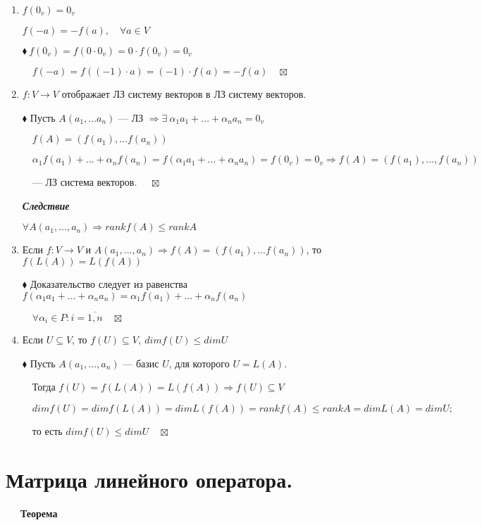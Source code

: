\documentclass[a4paper, 12pt]{report}
\begin{document}
	\begin{enumerate}
		\item $f(0_v) = 0_v$
		
		$f(-a) = -f(a), \quad \forall a\in V$
		
		$\blacklozenge \ f(0_v) = f(0\cdot 0_v) = 0\cdot f(0_v) = 0_v$
		
		$\quad f(-a) = f((-1)\cdot a) = (-1)\cdot f(a) = -f(a) \quad \boxtimes$
		
		\item $f: V\rightarrow V$ отображает ЛЗ систему векторов в ЛЗ систему векторов.
		
		$\blacklozenge$ Пусть $A(a_1,...a_n)$ --- ЛЗ $\Rightarrow \exists\  \alpha_1 a_1 + ... + \alpha_n a_n = 0_v$
		
		$\quad f(A) = (f(a_1),...f(a_n))$
		
		$\quad \alpha_1 f(a_1) + ... + \alpha_n f(a_n) = f(\alpha_1 a_1 + ... + \alpha_n a_n) = f(0_v) = 0_v \Rightarrow f(A) = (f(a_1),...,f(a_n))$ 
		
		$\quad$--- ЛЗ система векторов. $\quad \boxtimes$
		
		\textit{\textbf{Следствие}}
		
		$\forall A(a_1,...,a_n)\Rightarrow rank f(A) \leqslant rank A$
		\item Если $f:V\rightarrow V$ и $A(a_1,...,a_n)\Rightarrow f(A) = (f(a_1),...f(a_n))$, то $f(L(A)) = L(f(A))$
		
		$\blacklozenge$ Доказательство следует из равенства $f(\alpha_1 a_1 + ... + \alpha_n a_n) = \alpha_1 f(a_1) + ... + \alpha_n f(a_n)$
		
		$\quad\forall\alpha_i\in P:i=\overline{1,n}\quad\boxtimes$
		\item Если $U\subseteq V$, то $f(U) \subseteq V,\ dimf(U) \leqslant dimU$
		
		$\blacklozenge$ Пусть $A(a_1,...,a_n)$ --- базис $U$, для которого $U = L(A)$.
		
		$\quad$Тогда $f(U) = f(L(A))=L(f(A))\Rightarrow f(U) \subseteq V$
		
		$\quad dim f(U) = dim f(L(A)) = dim L(f(A)) = rank f(A) \leqslant rank A = dim L(A) = dim U;$
		
		$\quad$то есть $dimf(U) \leqslant dimU\quad\boxtimes$
	\end{enumerate}
	
	
	
	
	
	
	
	
	
	\section{Матрица линейного оператора.}
	$\quad\;\ $\textbf{Теорема}
	
\end{document}

